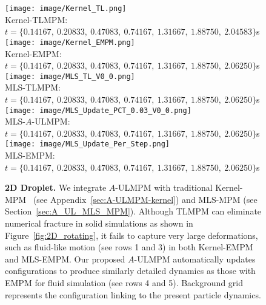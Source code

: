 \begin{figure*}[t]
\vspace*{-4mm}
\begin{center}
\texttt{[image: image/Kernel\_TL.png]}\\
\vspace{-1mm}
Kernel-TLMPM: $t=\{0.14167,\:0.20833,\:0.47083,\:0.74167,\:1.31667,\:1.88750,\:2.04583\}$s\\
\texttt{[image: image/Kernel\_EMPM.png]}\\
\vspace{-1mm}
Kernel-EMPM: $t=\{0.14167,\:0.20833,\:0.47083,\:0.74167,\:1.31667,\:1.88750,\:2.06250\}$s\\
\texttt{[image: image/MLS\_TL\_V0\_0.png]}\\
\vspace{-1mm}
MLS-TLMPM: $t=\{0.14167,\:0.20833,\:0.47083,\:0.74167,\:1.31667,\:1.88750,\:2.06250\}$s\\
\texttt{[image: image/MLS\_Update\_PCT\_0.03\_V0\_0.png]}\\
\vspace{-1mm}
MLS-$A$-ULMPM: $t=\{0.14167,\:0.20833,\:0.47083,\:0.74167,\:1.31667,\:1.88750,\:2.06250\}$s\\
\texttt{[image: image/MLS\_Update\_Per\_Step.png]}\\
\vspace{-2mm}
MLS-EMPM: $t=\{0.14167,\:0.20833,\:0.47083,\:0.74167,\:1.31667,\:1.88750,\:2.06250\}$s\\
\vspace{-4mm}
\end{center}
\caption{\textbf{2D Droplet.} 
We integrate $A$-ULMPM with traditional Kernel-MPM~\cite{Stomakhin:2013:MPMsnow} (see Appendix~\ref{sec:A-ULMPM-kernel}) and MLS-MPM (see Section~\ref{sec:A_UL_MLS_MPM}). 
Although TLMPM can eliminate numerical fracture in solid simulations as shown in Figure~\ref{fig:2D_rotating}, it fails to capture very large deformations, such as fluid-like motion (see rows 1 and 3) in both Kernel-EMPM and MLS-EMPM. Our proposed $A$-ULMPM automatically updates configurations to produce similarly detailed dynamics as those with EMPM for fluid simulation (see rows 4 and 5). Background grid represents the configuration linking to the present particle dynamics.}
\vspace*{-3mm}
\label{fig:2D_droplet}
\end{figure*}

